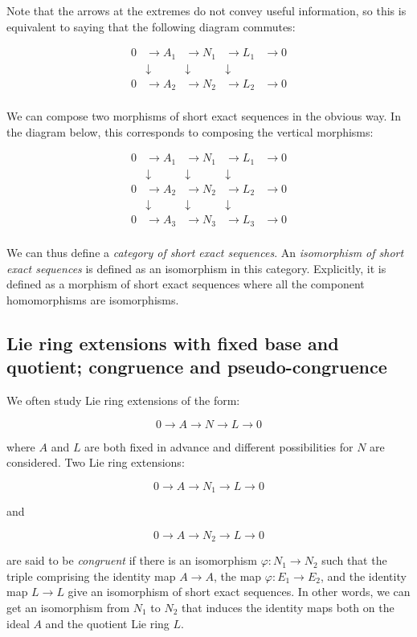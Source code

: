 Note that the arrows at the extremes do not convey useful information,
so this is equivalent to saying that the following diagram commutes:

$$\begin{array}{rrrrr}
  0 & \to A_1 & \to N_1 & \to L_1 & \to 0 \\
  & \downarrow & \downarrow & \downarrow &\\
  0 & \to A_2 & \to N_2 & \to L_2 & \to 0 \\
\end{array}$$

We can compose two morphisms of short exact sequences in the obvious
way. In the diagram below, this corresponds to composing the vertical
morphisms:

$$\begin{array}{rrrrr}
  0 & \to A_1 & \to N_1 & \to L_1 & \to 0 \\
  & \downarrow & \downarrow & \downarrow & \\
  0 & \to A_2 & \to N_2 & \to L_2 & \to 0 \\
  & \downarrow & \downarrow & \downarrow & \\
  0 & \to A_3 & \to N_3 & \to L_3 & \to 0 \\
\end{array}$$

We can thus define a {\em category of short exact sequences}. An
{\em isomorphism of short exact sequences} is defined as an
isomorphism in this category. Explicitly, it is defined as a morphism
of short exact sequences where all the component homomorphisms are
isomorphisms.

\subsection{Lie ring extensions with fixed base and quotient; congruence and pseudo-congruence}

We often study Lie ring extensions of the form:

$$0 \to A \to N \to L \to 0$$

where $A$ and $L$ are both fixed in advance and different
possibilities for $N$ are considered. Two Lie ring extensions:

$$0 \to A \to N_1 \to L \to 0$$

and

$$0 \to A \to N_2 \to L \to 0$$

are said to be {\em congruent} if there is an isomorphism $\varphi:
N_1 \to N_2$ such that the triple comprising the identity map $A \to
A$, the map $\varphi:E_1 \to E_2$, and the identity map $L \to L$ give
an isomorphism of short exact sequences. In other words, we can get an
isomorphism from $N_1$ to $N_2$ that induces the identity maps both on
the ideal $A$ and the quotient Lie ring $L$.

